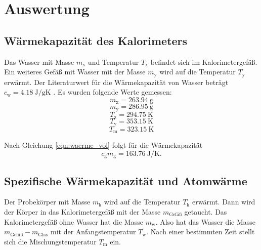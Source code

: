 \section{Auswertung}
\label{sec:Auswertung}
\subsection{Wärmekapazität des Kalorimeters}
Das Wasser mit Masse $m_\text{x}$ und Temperatur $T_\text{x}$ befindet sich im Kalorimetergefäß.
Ein weiteres Gefäß mit Wasser mit der Masse $m_\text{y}$ wird auf die Temperatur $T_\text{y}$ erwärmt.
Der Literaturwert für die Wärmekapazität von Wasser beträgt $c_\text{w} = \SI{4.18}{\joule / \gram\kelvin}$ \cite[159]{anleitung}.
Es wurden folgende Werte gemessen:
\begin{equation*}
    m_\text{x} = \SI{263.94}{\gram}
\end{equation*}
\begin{equation*}
    m_\text{y} = \SI{286.95}{\gram}
\end{equation*}
\begin{equation*}
    T_\text{x} = \SI{294.75}{\kelvin}    
\end{equation*}
\begin{equation*}
    T_\text{y} = \SI{353.15}{\kelvin}
\end{equation*}
\begin{equation*}
    T_\text{m} = \SI{323.15}{\kelvin}
\end{equation*}

Nach Gleichung \eqref{eqn:waerme_vol} folgt für die Wärmekapazität
\begin{equation}
    c_\text{g}m_\text{g} = \SI{163.76}{\joule/\kelvin} .
\end{equation}

\subsection{Spezifische Wärmekapazität und Atomwärme}
Der Probekörper mit Masse $m_\text{k}$ wird auf die Temperatur $T_\text{k}$ erwärmt.
Dann wird der Körper in das Kalorimetergefäß mit der Masse $m_\text{Gefäß}$ getaucht.
Das Kalorimetergefäß ohne Wasser hat die Masse $m_\text{w}$.
Also hat das Wasser die Masse $m_\text{Gefäß}-m_\text{Glas}$ mit der Anfangstemperatur $T_\text{w}$.
Nach einer bestimmten Zeit stellt sich die Mischungstemperatur $T_\text{m}$ ein.
